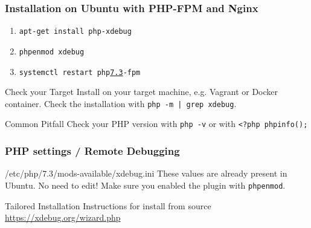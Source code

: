 \begin{frame}\frametitle{Installation on Ubuntu with PHP-FPM and Nginx}
    \begin{enumerate}
        \item \texttt{apt-get install php-xdebug} \pause
        \item \texttt{phpenmod xdebug} \pause
        \item \texttt{systemctl restart php\underline{7.3}-fpm} \pause
    \end{enumerate}
    \begin{block}{Check your Target}
        Install on your target machine, e.g. Vagrant or Docker container. Check the installation with \texttt{php -m | grep xdebug}.
    \end{block}
    \pause
    \begin{alertblock}{Common Pitfall}
        Check your PHP version with \texttt{php -v} or with \texttt{<?php phpinfo();}
    \end{alertblock}
\end{frame}

\begin{frame}\frametitle{PHP settings / Remote Debugging}
    
    \begin{block}{/etc/php/7.3/mods-available/xdebug.ini}
        These values are already present in Ubuntu. No need to edit! Make sure you enabled the plugin with \texttt{phpenmod}.
    \end{block} \pause
    \begin{exampleblock}{Tailored Installation Instructions for install from source}
        \href{https://xdebug.org/wizard.php}{https://xdebug.org/wizard.php}
    \end{exampleblock}
\end{frame}
